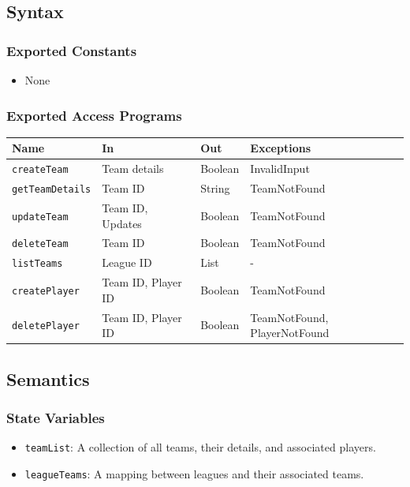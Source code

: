 \documentclass[12pt, titlepage]{article}
\begin{document}
\subsection{Syntax}

\subsubsection{Exported Constants}
\begin{itemize}
\item None
\end{itemize}

\subsubsection{Exported Access Programs}
\begin{center}
\begin{tabular}{|p{3cm}|p{4cm}|p{4cm}|p{4cm}|}
\hline
\textbf{Name} & \textbf{In} & \textbf{Out} & \textbf{Exceptions} \\
\hline
\texttt{createTeam} & Team details & Boolean & InvalidInput \\
\texttt{getTeamDetails} & Team ID & String & TeamNotFound \\
\texttt{updateTeam} & Team ID, Updates & Boolean & TeamNotFound \\
\texttt{deleteTeam} & Team ID & Boolean & TeamNotFound \\
\texttt{listTeams} & League ID & List & - \\
\texttt{createPlayer} & Team ID, Player ID & Boolean & TeamNotFound \\
\texttt{deletePlayer} & Team ID, Player ID & Boolean & TeamNotFound, PlayerNotFound \\
\hline
\end{tabular}
\end{center}

\subsection{Semantics}

\subsubsection{State Variables}
\begin{itemize}
    \item \texttt{teamList}: A collection of all teams, their details, and associated players.
    \item \texttt{leagueTeams}: A mapping between leagues and their associated teams.
\end{itemize}
\end{document}
